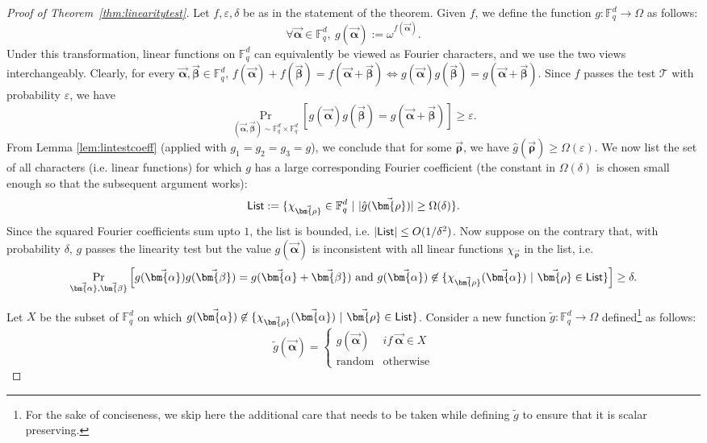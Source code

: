 \documentclass[11pt]{article}
\newcommand{\F}{\mathbb{F}}
\renewcommand{\epsilon}{\varepsilon}
\newcommand{\alphab}{\vec{\bm{\alpha}}}
\newcommand{\betab}{\vec{\bm{\beta}}}
\renewcommand{\tilde}{\widetilde}
\newcommand{\rhob}{\vec{\bm{\rho}}}
\begin{document}
\begin{proof}[Proof of Theorem~\ref{thm:linearitytest}] Let $f, \epsilon, \delta$ be as in the statement of the theorem. 
Given $f$, we define the function $g:\F_q^d\to\Omega$ as follows:
$$
\forall \alphab\in\F_q^d,\ g(\alphab):=\omega^{f(\alphab)}.$$
Under this transformation, linear functions on $\F_q^d$ can equivalently be viewed as Fourier characters, and we use the two views interchangeably. 
Clearly, for every $\alphab,\betab\in\F_q^d$, 
$
f(\alphab)+f(\betab)=f(\alphab+\betab)\Longleftrightarrow g(\alphab)g(\betab)=g(\alphab+\betab)
$. Since $f$ passes the test ${\mathcal T}$ with probability $\epsilon$, we have
  $$ \Pr_{(\alphab,\betab)\sim \F_q^d\times \F_q^d}[g(\alphab)g(\betab)=g(\alphab+\betab)] \geq \epsilon. $$ 
From Lemma \ref{lem:lintestcoeff} (applied with $g_1=g_2=g_3=g$), we conclude that for some $\rhob$, we have $\hat{g}(\rhob) \geq \Omega(\epsilon)$.
%
%
%
%
%
%
%
%
%
%
%
%
%
%
%
%
%
%
%
%
%
We now list the set of all characters (i.e. linear functions) for which $g$ has a large corresponding Fourier coefficient (the constant 
in $\Omega(\delta)$ is chosen small enough so that the subsequent argument works):  
%
$$ {\sf List} := \{\chi_{\rhob} \in \F_q^d  ~| ~ |\hat{g}(\rhob)| \geq \Omega(\delta)  \}.  
%
%
$$
Since the squared Fourier coefficients sum upto $1$, the list is bounded, i.e. $|{\sf List}| \leq O(1/\delta^2)$. Now suppose on the 
contrary that, with probability $\delta$, $g$ passes the linearity test but the value $g(\alphab)$ is inconsistent with all linear
functions $\chi_{\rhob}$ in the list, i.e. 
%
%
%
%
%
\begin{equation} \label{eqn:inconsistent}
\Pr_{\alphab,\betab } \left[ g(\alphab) g(\betab)= g(\alphab+\betab) \ \mbox{and} \ g(\alphab) \not\in \{ \chi_{\rhob}(\alphab) ~| ~ 
\rhob \in {\sf List} \}    
%
\right] \geq \delta.
\end{equation} 

Let $X$ be the subset of $\F_q^d$ on which $g(\alphab) \not\in \{ \chi_{\rhob}(\alphab) ~| ~
\rhob \in {\sf List} \}$. Consider a new function $\tilde{g}:\F_q^d\to\Omega$ defined\footnote{For the sake of conciseness, we skip here the additional care that needs to be taken while defining  $\tilde{g}$ to ensure that it is scalar preserving. } as follows:
$$
\tilde{g}(\alphab)=\begin{cases}
g(\alphab) & if \ \alphab\in X\\
\text{random} & \text{otherwise}
\end{cases}
$$


\end{proof}
\end{document}
